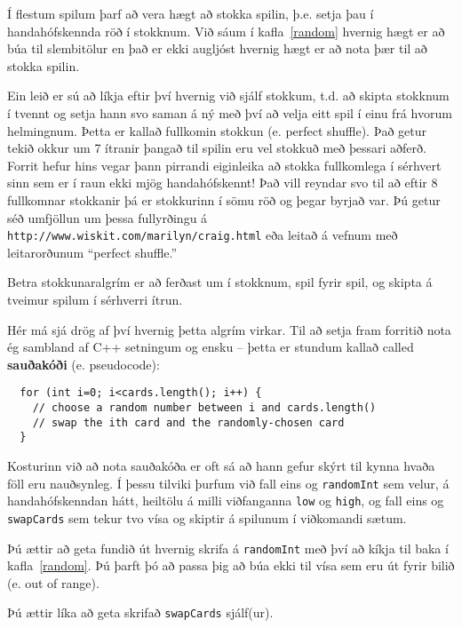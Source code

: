 Í flestum spilum þarf að vera hægt að stokka spilin, þ.e. setja þau í handahófskennda röð í stokknum.
Við sáum í kafla~\ref{random} hvernig hægt er að búa til slembitölur en það er ekki augljóst hvernig hægt er 
að nota þær til að stokka spilin.

Ein leið er sú að líkja eftir því hvernig við sjálf stokkum, t.d. að skipta stokknum í tvennt
og setja hann svo saman á ný með því að velja eitt spil í einu frá hvorum helmingnum.
Þetta er kallað fullkomin stokkun (e. perfect shuffle).
Það getur tekið okkur um 7 ítranir þangað til spilin eru vel stokkuð með þessari aðferð.
Forrit hefur hins vegar þann pirrandi eiginleika að stokka fullkomlega í sérhvert sinn sem er í raun ekki mjög handahófskennt!
Það vill reyndar svo til að eftir 8 fullkomnar stokkanir þá er stokkurinn í sömu röð og þegar byrjað var.
Þú getur séð umfjöllun um þessa fullyrðingu á {\tt http://www.wiskit.com/marilyn/craig.html} eða leitað á vefnum
með leitarorðunum ``perfect shuffle.''

Betra stokkunaralgrím er að ferðast um í stokknum, spil fyrir spil, og skipta á tveimur spilum í sérhverri ítrun. 


Hér má sjá drög af því hvernig þetta algrím virkar.
Til að setja fram forritið nota ég sambland af C++ setningum og ensku -- þetta er stundum kallað 
called {\bf sauðakóði} (e. pseudocode):

\begin{verbatim}
  for (int i=0; i<cards.length(); i++) {
    // choose a random number between i and cards.length()
    // swap the ith card and the randomly-chosen card
  }
\end{verbatim}
%
Kosturinn við að nota sauðakóða er oft sá að hann gefur skýrt til kynna hvaða föll eru nauðsynleg.
Í þessu tilviki þurfum við fall eins og {\tt randomInt} sem velur, á handahófskenndan hátt, heiltölu á milli
viðfanganna {\tt low} og {\tt high}, og fall eins og {\tt swapCards} sem tekur tvo vísa og skiptir á spilunum í viðkomandi sætum.


Þú ættir að geta fundið út hvernig skrifa á {\tt randomInt} með því að kíkja til baka í kafla~\ref{random}.
Þú þarft þó að passa þig að búa ekki til vísa sem eru út fyrir bilið (e. out of range). 


Þú ættir líka að geta skrifað {\tt swapCards} sjálf(ur). 

